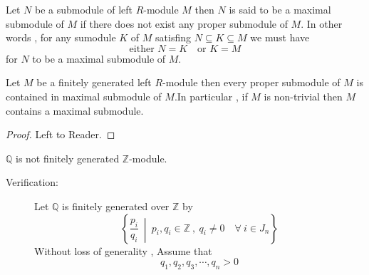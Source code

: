       \bigskip 
      \begin{defn}
      Let $N$ be a submodule of left $R$-module $M$ then $N$ is said to be a maximal submodule of $M$ if there does not exist any proper submodule of $M$.\newline\bigskip
      In other words , for any sumodule $K$ of $M$ satisfing 
      $N\subseteq K \subseteq M$ \newline we must have \[\text{either  } N = K \quad \text{or  } K = M  \] for $N$ to be a maximal submodule of $M$.
      \end{defn}
                   \bigskip
                   
      \begin{thm}
        Let $M$ be a finitely generated left $R$-module then every proper submodule of $M$ is contained in maximal submodule of $M$.\newline In particular , if $M$ is non-trivial then $M$ contains a maximal submodule.
      \end{thm}             
       \begin{proof}
         Left to Reader.
       \end{proof}
       \bigskip
       \begin{remark}
         $\mathbb{Q} $ is not finitely generated $\mathbb{Z}$-module.
       \end{remark}
       \begin{description}
         \item[Verification:] Let  $\mathbb{Q} $ is finitely generated over $\mathbb{Z}$ by 
         \[ \left\lbrace\frac{p_i}{q_i} \ \middle\vert\ p_i , q_i \in \mathbb{Z} \ , \ q_i \neq 0 \quad \forall \ i \in J_n\right\rbrace \]      Without loss of generality , Assume that \[q_1 , q_2 , q_3 , \cdots , q_n > 0\]
       \end{description}
